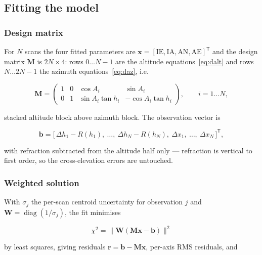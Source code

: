\documentclass[11pt,a4paper]{article}
\begin{document}
\subsection{Fitting the model}

\subsubsection{Design matrix}

For $N$ scans the four fitted parameters are $\mathbf{x} = [\text{IE}, \text{IA}, \text{AN}, \text{AE}]^\mathsf{T}$ and the design matrix $\mathbf{M}$ is $2N \times 4$: rows $0 \ldots N-1$ are the altitude equations~\eqref{eq:dalt} and rows $N \ldots 2N-1$ the azimuth equations~\eqref{eq:daz}, i.e.

\begin{equation}
\mathbf{M} =
\begin{pmatrix}
1 & 0 & \cos A_i & \sin A_i \\[2pt]
0 & 1 & \sin A_i \tan h_i & -\cos A_i \tan h_i
\end{pmatrix},
\qquad i = 1 \ldots N,
\end{equation}

stacked altitude block above azimuth block. The observation vector is

\begin{equation}
\mathbf{b} = \bigl[\,\Delta h_1 - R(h_1),\ \ldots,\ \Delta h_N - R(h_N),\ \Delta x_1,\ \ldots,\ \Delta x_N\,\bigr]^\mathsf{T},
\end{equation}

with refraction subtracted from the altitude half only --- refraction is vertical to first order, so the cross-elevation errors are untouched.

\subsubsection{Weighted solution}

With $\sigma_j$ the per-scan centroid uncertainty for observation $j$ and $\mathbf{W} = \operatorname{diag}(1/\sigma_j)$, the fit minimises

\begin{equation}
\chi^2 = \bigl\|\mathbf{W}(\mathbf{M}\mathbf{x} - \mathbf{b})\bigr\|^2
\end{equation}

by least squares, giving residuals $\mathbf{r} = \mathbf{b} - \mathbf{M}\mathbf{x}$, per-axis RMS residuals, and
\end{document}
